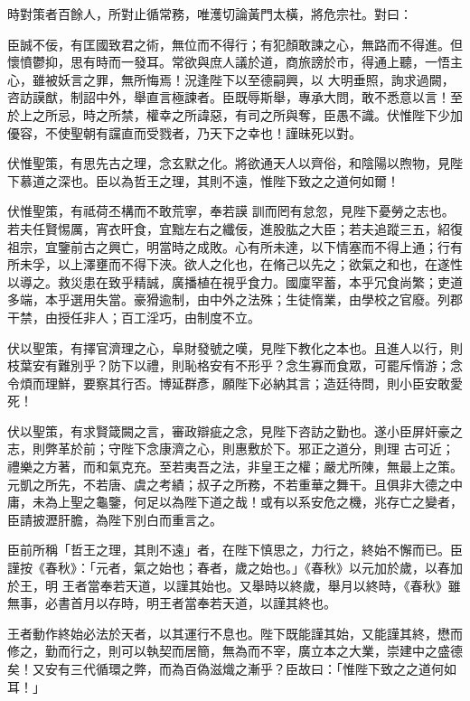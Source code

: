 \begin{pinyinscope}
 時對策者百餘人，所對止循常務，唯濩切論黃門太橫，將危宗社。對曰：



 臣誠不佞，有匡國致君之術，無位而不得行；有犯顏敢諫之心，無路而不得進。但懷憤鬱抑，思有時而一發耳。常欲與庶人議於道，商旅謗於市，得通上聽，一悟主心，雖被妖言之罪，無所悔焉！況逢陛下以至德嗣興，以
 大明垂照，詢求過闕，咨訪謨猷，制詔中外，舉直言極諫者。臣既辱斯舉，專承大問，敢不悉意以言！至於上之所忌，時之所禁，權幸之所諱惡，有司之所與奪，臣愚不識。伏惟陛下少加優容，不使聖朝有讜直而受戮者，乃天下之幸也！謹昧死以對。



 伏惟聖策，有思先古之理，念玄默之化。將欲通天人以齊俗，和陰陽以煦物，見陛下慕道之深也。臣以為哲王之理，其則不遠，惟陛下致之之道何如爾！



 伏惟聖策，有祗荷丕構而不敢荒寧，奉若謨
 訓而罔有怠忽，見陛下憂勞之志也。若夫任賢惕厲，宵衣旰食，宜黜左右之纖佞，進股肱之大臣；若夫追蹤三五，紹復祖宗，宜鑒前古之興亡，明當時之成敗。心有所未達，以下情塞而不得上通；行有所未孚，以上澤壅而不得下浹。欲人之化也，在脩己以先之；欲氣之和也，在遂性以導之。救災患在致乎精誠，廣播植在視乎食力。國廩罕蓄，本乎冗食尚繁；吏道多端，本乎選用失當。豪猾逾制，由中外之法殊；生徒惰業，由學校之官廢。列郡
 干禁，由授任非人；百工淫巧，由制度不立。



 伏以聖策，有擇官濟理之心，阜財發號之嘆，見陛下教化之本也。且進人以行，則枝葉安有難別乎？防下以禮，則恥格安有不形乎？念生寡而食眾，可罷斥惰游；念令煩而理鮮，要察其行否。博延群彥，願陛下必納其言；造廷待問，則小臣安敢愛死！



 伏以聖策，有求賢箴闕之言，審政辯疵之念，見陛下咨訪之勤也。遂小臣屏奸豪之志，則弊革於前；守陛下念康濟之心，則惠敷於下。邪正之道分，則理
 古可近；禮樂之方著，而和氣克充。至若夷吾之法，非皇王之權；嚴尤所陳，無最上之策。元凱之所先，不若唐、虞之考績；叔子之所務，不若重華之舞干。且俱非大德之中庸，未為上聖之龜鑒，何足以為陛下道之哉！或有以系安危之機，兆存亡之變者，臣請披瀝肝膽，為陛下別白而重言之。



 臣前所稱「哲王之理，其則不遠」者，在陛下慎思之，力行之，終始不懈而已。臣謹按《春秋》：「元者，氣之始也；春者，歲之始也。」《春秋》以元加於歲，以春加於王，明
 王者當奉若天道，以謹其始也。又舉時以終歲，舉月以終時，《春秋》雖無事，必書首月以存時，明王者當奉若天道，以謹其終也。



 王者動作終始必法於天者，以其運行不息也。陛下既能謹其始，又能謹其終，懋而修之，勤而行之，則可以執契而居簡，無為而不宰，廣立本之大業，崇建中之盛德矣！又安有三代循環之弊，而為百偽滋熾之漸乎？臣故曰：「惟陛下致之之道何如耳！」




\end{pinyinscope}
